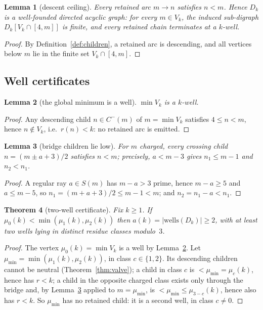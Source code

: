 \documentclass[11pt]{article}
\theoremstyle{plain}
\newtheorem{theorem}{Theorem}[section]
\newtheorem{lemma}[theorem]{Lemma}
\theoremstyle{definition}
\newcommand{\rays}{S}
\newcommand{\rch}{r}
\newcommand{\Vk}{V_{k}}
\newcommand{\Dk}{D_{k}}
\newcommand{\wells}{\mathrm{wells}}
\begin{document}
\begin{lemma}[descent ceiling]\label{lem:ceiling}
Every retained arc $m \to n$ satisfies $n < m$. Hence $\Dk$ is a
well-founded directed acyclic graph: for every $m \in \Vk$, the
induced sub-digraph $\Dk[\Vk \cap [4, m]]$ is finite, and every
retained chain terminates at a $k$-well.
\end{lemma}

\begin{proof}
By Definition~\ref{def:children}, a retained arc is descending, and
all vertices below $m$ lie in the finite set $\Vk \cap [4, m]$.
\end{proof}

\subsection{Well certificates}

\begin{lemma}[the global minimum is a well]\label{lem:min}
$\min \Vk$ is a $k$-well.
\end{lemma}

\begin{proof}
Any descending child $n \in C^{-}(m)$ of $m = \min \Vk$ satisfies
$4 \le n < m$, hence $n \notin \Vk$, i.e.\ $\rch(n) < k$: no
retained arc is emitted.
\end{proof}

\begin{lemma}[bridge children lie low]\label{lem:low}
For $m$ charged, every crossing child
$n = (m \pm a + 3)/2$ satisfies $n < m$; precisely,
$a < m - 3$ gives $n_1 \le m - 1$ and $n_2 < n_1$.
\end{lemma}

\begin{proof}
A regular ray $a \in \rays(m)$ has $m - a > 3$ prime, hence
$m - a \ge 5$ and $a \le m - 5$, so
$n_1 = (m + a + 3)/2 \le m - 1 < m$; and
$n_2 = n_1 - a < n_1$.
\end{proof}

\begin{theorem}[two-well certificate]\label{thm:cert2}
Fix $k \ge 1$. If $\mu_0(k) < \min(\mu_1(k),\mu_2(k))$ then
$a(k) = |\wells(\Dk)| \ge 2$, with at least two wells lying in
distinct residue classes modulo~$3$.
\end{theorem}

\begin{proof}
The vertex $\mu_0(k) = \min \Vk$ is a well by
Lemma~\ref{lem:min}. Let
$\mu_{\min} = \min(\mu_1(k),\mu_2(k))$, in class $c \in \{1,2\}$.
Its descending children cannot be neutral (Theorem~\ref{thm:valve});
a child in class $c$ is $< \mu_{\min} = \mu_c(k)$, hence has
$\rch < k$; a child in the opposite charged class exists only
through the bridge and, by Lemma~\ref{lem:low} applied to
$m = \mu_{\min}$, is $< \mu_{\min} \le \mu_{3-c}(k)$, hence also
has $\rch < k$. So $\mu_{\min}$
has no retained child: it is a second well, in class $c \neq 0$.
\end{proof}
\end{document}
